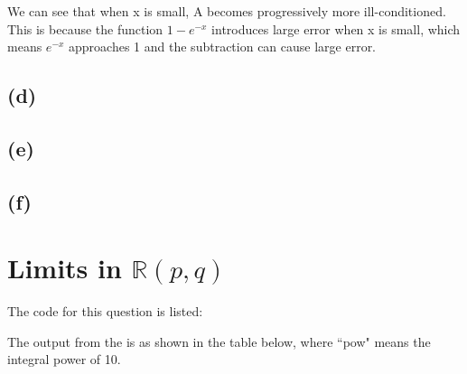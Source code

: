 \documentclass[a4paper, 12pt]{article}
\begin{document}
We can see that when x is small, A becomes progressively more ill-conditioned. This is because the function $1-e^{-x}$ introduces large error when x is small, which means $e^{-x}$ approaches 1 and the subtraction can cause large error.

\subsection*{(d)}


\subsection*{(e)}


\subsection*{(f)}



\section{Limits in $\mathbb{R}(p,q)$}

The code for this question is listed:

\begin{tiny}

\end{tiny}

The output from the is as shown in the table below, where ``pow" means the integral power of 10.
\end{document}
